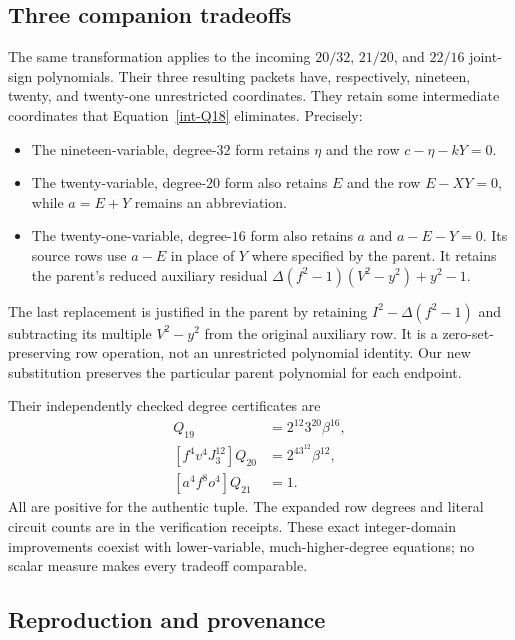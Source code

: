 \subsection{Three companion tradeoffs}
\label{int-companions}

The same transformation applies to the incoming $20/32$, $21/20$, and
$22/16$ joint-sign polynomials.  Their three resulting packets have,
respectively, nineteen, twenty, and twenty-one unrestricted coordinates.
They retain some intermediate coordinates that Equation~\eqref{int-Q18}
eliminates.  Precisely:
\begin{itemize}
\item The nineteen-variable, degree-$32$ form retains $\eta$ and the row
      $c-\eta-kY=0$.
\item The twenty-variable, degree-$20$ form also retains $E$ and the row
      $E-XY=0$, while $a=E+Y$ remains an abbreviation.
\item The twenty-one-variable, degree-$16$ form also retains $a$ and
      $a-E-Y=0$.  Its source rows use $a-E$ in place of $Y$ where specified
      by the parent.  It retains the parent's reduced auxiliary residual
      $\Delta(f^2-1)(V^2-y^2)+y^2-1$.
\end{itemize}
The last replacement is justified in the parent by retaining
$I^2-\Delta(f^2-1)$ and subtracting its multiple $V^2-y^2$ from the
original auxiliary row.  It is a zero-set-preserving row operation, not
an unrestricted polynomial identity.  Our new substitution preserves the
particular parent polynomial for each endpoint.

Their independently checked degree certificates are
\begin{align*}
 [\eta^4h^4w^4v^4J_3^{16}]Q_{19}&=2^{12}3^{20}\beta^{16},\\
 [f^4v^4J_3^{12}]Q_{20}&=2^43^{12}\beta^{12},\\
 [a^4f^8o^4]Q_{21}&=1.
\end{align*}
All are positive for the authentic tuple.  The expanded row degrees and
literal circuit counts are in the verification receipts.  These exact
integer-domain improvements coexist with lower-variable, much-higher-degree
equations; no scalar measure makes every tradeoff comparable.

\subsection{Reproduction and provenance}
\label{int-reproduction}

